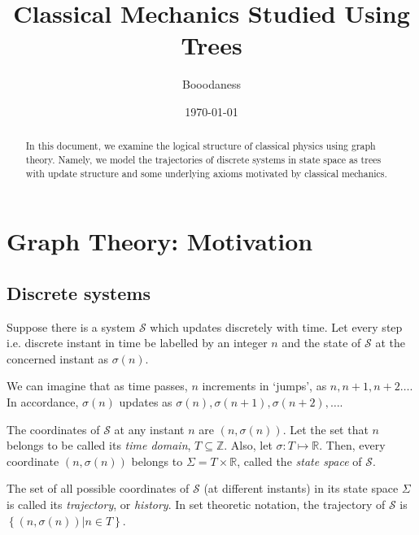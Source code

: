 \documentclass[12 pt]{article}
\title{Classical Mechanics Studied Using Trees}
\author{Booodaness}
\date{\today}
\begin{document}

\begin{titlepage}
\maketitle
\begin{abstract}
In this document, we examine the logical structure of classical physics using graph theory. Namely, we model the trajectories of discrete systems in state space as trees with update structure and some underlying axioms motivated by classical mechanics.
\end{abstract}
\end{titlepage}

\setcounter{page}{2}

\tableofcontents

\clearpage
{}

\section{Graph Theory: Motivation}

\subsection{Discrete systems}

Suppose there is a system $\mathcal{S}$ which updates discretely with time. Let every step i.e. discrete instant in time be labelled by an integer $n$ and the state of $\mathcal{S}$ at the concerned instant as $\sigma \left( n \right)$.

We can imagine that as time passes, $n$ increments in `jumps', as $n, n+1, n+2 \dots$. In accordance, $\sigma \left( n \right)$ updates as $\sigma \left( n \right), \sigma \left( n+1 \right), \sigma \left( n+2 \right), \dots$.

The coordinates of $\mathcal{S}$ at any instant $n$ are $\left( n, \sigma \left( n \right) \right)$. Let the set that $n$ belongs to be called its \emph{time domain}, $T \subseteq \mathbb{Z}$. Also, let $\sigma : T \mapsto \mathbb{R}$. Then, every coordinate $\left( n, \sigma \left( n \right) \right)$ belongs to $\Sigma = T \times \mathbb{R}$, called the \emph{state space} of $\mathcal{S}$.

The set of all possible coordinates of $\mathcal{S}$ (at different instants) in its state space $\Sigma$ is called its \emph{trajectory}, or \emph{history}. In set theoretic notation, the trajectory of $\mathcal{S}$ is $\left\{ \left( n, \sigma \left( n \right) \right) \vert n \in T \right\}$.
\end{document}
